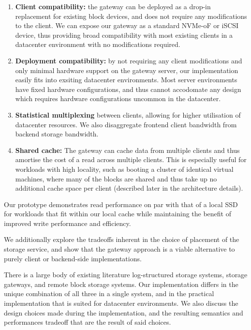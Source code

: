 \begin{enumerate}

    \item \textbf{Client compatibility:} the gateway can be deployed as a drop-in
          replacement for existing block devices, and does not require any modifications
          to the client. We can expose our gateway as a standard NVMe-oF or iSCSI
          device, thus providing broad compatibility with most existing clients in a
          datacenter environment with no modifications required.

    \item \textbf{Deployment compatibility:} by not requiring any client
          modifications and only minimal hardware support on the gateway server, our
          implementation easily fits into exsiting datacenter environments. Most
          server environments have fixed hardware configurations, and thus cannot
          accodomate any design which requires hardware configurations uncommon
          in the datacenter.

    \item \textbf{Statistical multiplexing} between clients, allowing for higher
          utilisation of datacenter resources. We also disaggregate frontend client
          bandwidth from backend storage bandwidth.

    \item \textbf{Shared cache:} The gateway can cache data from multiple clients
          and thus amortise the cost of a read across multiple clients. This is
          especially useful for workloads with high locality, such as booting a cluster
          of identical virtual machines, where many of the blocks are shared and thus
          take up no additional cache space per client (described later in the
          architecture details).

\end{enumerate}

Our prototype demonstrates read performance on par with that of a local SSD for
workloads that fit within our local cache while maintaining the benefit of
improved write performance and efficiency.

We additionally explore the tradeoffs inherent in the choice of placement of
the storage service, and show that the gateway approach is a viable alternative
to purely client or backend-side implementations.

There is a large body of existing literature log-structured storage systems,
storage gateways, and remote block storage systems. Our implementation differs
in the unique combination of all three in a single system, and in the practical
implementation that is suited for datacenter environments. We also discuss the
design choices made during the implementation, and the resulting semantics and
performances tradeoff that are the result of said choices.

